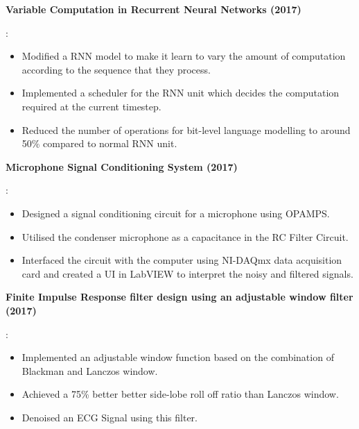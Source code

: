 \documentclass[letterpaper,11pt]{article}
\newcommand{\resumeItem}[2]{
	\item\small{
		\textbf{#1}{: #2 \vspace{-5pt}}
	}
}
\newcommand{\resumeSubItem}[2]{\resumeItem{#1}{#2}\vspace{-1pt}}
\newcommand{\resumeSubItemOneArg}[1]{\item \small #1\vspace{-1pt}}
\newcommand{\resumeItemListStart}{\begin{itemize} \vspace*{-5pt}}
\newcommand{\resumeItemListEnd}{\end{itemize}}
\begin{document}
	\resumeSubItem{Variable Computation in Recurrent Neural Networks (2017)}{
		\resumeItemListStart
		\resumeSubItemOneArg{Modified a RNN model to make it learn to vary the amount of computation according to the sequence that they process.} 
		\resumeSubItemOneArg{Implemented a scheduler for the RNN unit which decides the computation required at the current timestep.}
		\resumeSubItemOneArg{Reduced the number of operations for bit-level language modelling to around 50\% compared to normal RNN unit.}
		\resumeItemListEnd
		
	\resumeSubItem{Microphone Signal Conditioning System (2017)}{
		\resumeItemListStart
		\resumeSubItemOneArg{Designed a signal conditioning circuit for a microphone using OPAMPS.} 
		\resumeSubItemOneArg{Utilised the condenser microphone as a capacitance in the RC Filter Circuit. }
		\resumeSubItemOneArg{Interfaced the circuit with the computer using NI-DAQmx data acquisition card and created a UI in LabVIEW to interpret the noisy and filtered signals.}
		\resumeItemListEnd
	}
		\resumeSubItem{Finite Impulse Response filter design using an adjustable window filter  (2017)}{
		\resumeItemListStart
		\resumeSubItemOneArg{Implemented an adjustable window function based on the combination of Blackman and Lanczos window.}
		\resumeSubItemOneArg{Achieved a 75\% better better side-lobe roll off ratio than Lanczos window.}
		\resumeSubItemOneArg{Denoised an ECG Signal using this filter.}
		\resumeItemListEnd
	}
	
	}
	
\end{document}
